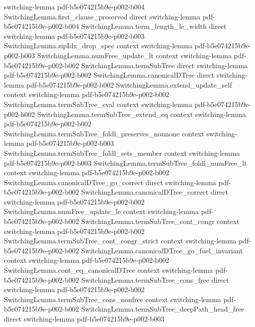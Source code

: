 \begin{theorem}
  {switching-lemma}
  {pdf-b5e074215b9e-p002-b004}
\proofstep
  {SwitchingLemma.first_clause_preserved}
  {direct}
  {switching-lemma}
  {pdf-b5e074215b9e-p002-b004}
\proofstep
  {SwitchingLemma.term_length_le_width}
  {direct}
  {switching-lemma}
  {pdf-b5e074215b9e-p002-b003}
\proofstep
  {SwitchingLemma.zipIdx_drop_spec}
  {context}
  {switching-lemma}
  {pdf-b5e074215b9e-p002-b003}
\proofstep
  {SwitchingLemma.numFree_update_lt}
  {context}
  {switching-lemma}
  {pdf-b5e074215b9e-p002-b002}
\proofstep
  {SwitchingLemma.termSubTree}
  {direct}
  {switching-lemma}
  {pdf-b5e074215b9e-p002-b002}
\proofstep
  {SwitchingLemma.canonicalDTree}
  {direct}
  {switching-lemma}
  {pdf-b5e074215b9e-p002-b002}
\proofstep
  {SwitchingLemma.extend_update_self}
  {context}
  {switching-lemma}
  {pdf-b5e074215b9e-p002-b002}
\proofstep
  {SwitchingLemma.termSubTree_eval}
  {context}
  {switching-lemma}
  {pdf-b5e074215b9e-p002-b002}
\proofstep
  {SwitchingLemma.termSubTree_extend_eq}
  {context}
  {switching-lemma}
  {pdf-b5e074215b9e-p002-b002}
\proofstep
  {SwitchingLemma.termSubTree_foldl_preserves_nonnone}
  {context}
  {switching-lemma}
  {pdf-b5e074215b9e-p002-b003}
\proofstep
  {SwitchingLemma.termSubTree_foldl_sets_member}
  {context}
  {switching-lemma}
  {pdf-b5e074215b9e-p002-b003}
\proofstep
  {SwitchingLemma.termSubTree_foldl_numFree_lt}
  {context}
  {switching-lemma}
  {pdf-b5e074215b9e-p002-b002}
\proofstep
  {SwitchingLemma.canonicalDTree_go_correct}
  {direct}
  {switching-lemma}
  {pdf-b5e074215b9e-p002-b002}
\proofstep
  {SwitchingLemma.canonicalDTree_correct}
  {direct}
  {switching-lemma}
  {pdf-b5e074215b9e-p002-b002}
\proofstep
  {SwitchingLemma.numFree_update_le}
  {context}
  {switching-lemma}
  {pdf-b5e074215b9e-p002-b002}
\proofstep
  {SwitchingLemma.termSubTree_cont_congr}
  {context}
  {switching-lemma}
  {pdf-b5e074215b9e-p002-b002}
\proofstep
  {SwitchingLemma.termSubTree_cont_congr_strict}
  {context}
  {switching-lemma}
  {pdf-b5e074215b9e-p002-b002}
\proofstep
  {SwitchingLemma.canonicalDTree_go_fuel_invariant}
  {context}
  {switching-lemma}
  {pdf-b5e074215b9e-p002-b002}
\proofstep
  {SwitchingLemma.cont_eq_canonicalDTree}
  {context}
  {switching-lemma}
  {pdf-b5e074215b9e-p002-b002}
\proofstep
  {SwitchingLemma.termSubTree_cons_free}
  {direct}
  {switching-lemma}
  {pdf-b5e074215b9e-p002-b002}
\proofstep
  {SwitchingLemma.termSubTree_cons_nonfree}
  {context}
  {switching-lemma}
  {pdf-b5e074215b9e-p002-b002}
\proofstep
  {SwitchingLemma.termSubTree_deepPath_head_free}
  {direct}
  {switching-lemma}
  {pdf-b5e074215b9e-p002-b003}

\end{theorem}
